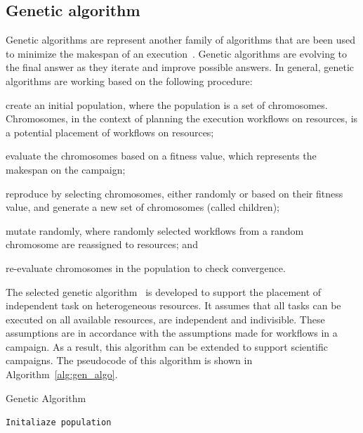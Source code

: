 \subsection{Genetic algorithm}
\label{algo:gen}
Genetic algorithms are represent another family of algorithms that are been used to minimize the makespan of an execution~\cite{dong2006scheduling}.
Genetic algorithms are evolving to the final answer as they iterate and improve possible answers.
In general, genetic algorithms are working based on the following procedure:
\begin{inparaenum}[(i)]
    \item create an initial population, where the population is a set of chromosomes. 
          Chromosomes, in the context of planning the execution workflows on resources, is a potential placement of workflows on resources;
    \item evaluate the chromosomes based on a fitness value, which represents the makespan on the campaign;
    \item reproduce by selecting chromosomes, either randomly or based on their fitness value, and generate a new set of chromosomes (called children);
    \item mutate randomly, where randomly selected workflows from a random chromosome are reassigned to resources; and
    \item re-evaluate chromosomes in the population to check convergence.
\end{inparaenum}

The selected genetic algorithm~\cite{page2005algorithm} is developed to support the placement of independent task on heterogeneous resources.
It assumes that all tasks can be executed on all available resources, are independent and indivisible.
These assumptions are in accordance with the assumptions made for workflows in a campaign.
As a result, this algorithm can be extended to support scientific campaigns.
The pseudocode of this algorithm is shown in Algorithm~\ref{alg:gen_algo}.

\begin{algorithm}[ht]
    \caption{Genetic Algorithm}
    \label{alg:gen_algo}
    \begin{algorithmic}[1]
        \State \texttt{Initaliaze population}
        \EndWhile
        \EndProcedure
    \end{algorithmic}
\end{algorithm}


